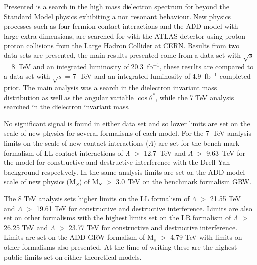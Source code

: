 Presented is a search in the high mass dielectron spectrum for beyond the Standard Model physics exhibiting a non resonant behaviour. New physics processes such as four fermion contact interactions and the ADD model with large extra dimensions, are searched for with the ATLAS detector using proton-proton collisions from the Large Hadron Collider at CERN. Results from two data sets are presented, the main results presented come from a data set with $\sqrt{s}$ = 8~TeV and an integrated luminosity of 20.3~fb$^{-1}$, these results are compared to a data set with $\sqrt{s}$ = 7~TeV and an integrated luminosity of 4.9~fb$^{-1}$ completed prior. The main analysis was a search in the dielectron invariant mass distribution as well as the angular variable $\cos{\theta^{*}}$, while the 7 TeV analysis searched in the dielectron invariant mass. 

No significant signal is found in either data set and so lower limits are set on the scale of new physics for several formalisms of each model. 
For the 7~TeV analysis limits on the scale of new contact interactions ($\Lambda$) are set for the bench mark formalism of LL contact interactions of $\Lambda$ $>$ 12.7~TeV and $\Lambda$ $>$ 9.63~TeV for the model for constructive and destructive interference with the Drell-Yan background respectively. In the same analysis limits are set on the ADD model scale of new physics (M$_{S}$) of M$_{S}$ $>$ 3.0~TeV on the benchmark formalism GRW.

The 8 TeV analysis sets higher limits on the LL formalism of $\Lambda$ $>$ 21.55 TeV and $\Lambda$ $>$ 19.61 TeV for constructive and destructive interference. Limits are also set on other formalisms with the highest limits set on the LR formalism of $\Lambda$ $>$ 26.25 TeV and $\Lambda$ $>$ 23.77 TeV for constructive and destructive interference. Limits are set on the ADD GRW formalism of M$_{s}$ $>$ 4.79 TeV with limits on other formalisms also presented. At the time of writing these are the highest public limits set on either theoretical models.



